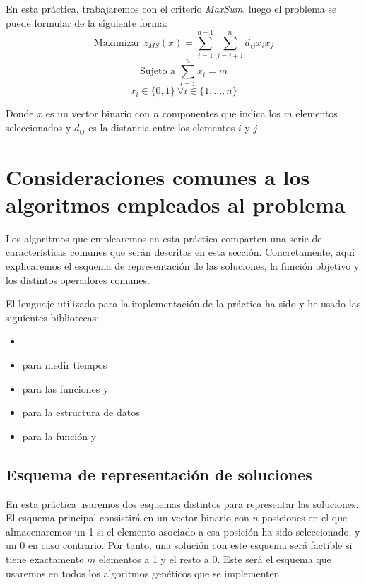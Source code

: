 \documentclass[10pt,a4paper]{article}
\begin{document}
En esta práctica, trabajaremos con el criterio \textit{MaxSum}, luego el problema se puede formular de la siguiente forma:
$$ \text{Maximizar  } z_{MS}(x) = \sum_{i=1}^{n-1} \sum_{j=i+1}^{n} d_{ij} x_i x_j $$
$$ \text{Sujeto a  } \sum_{i=1}^{n} x_i = m $$
$$ x_i \in \{0,1\} \ \forall i \in \{1,\dots,n\} $$

Donde $x$ es un vector binario con $n$ componentes que indica los $m$ elementos seleccionados y $d_{ij}$ es la distancia entre los elementos $i$ y $j$.










\section{Consideraciones comunes a los algoritmos empleados al problema}

Los algoritmos que emplearemos en esta práctica comparten una serie de características comunes que serán descritas en esta sección. Concretamente, aquí explicaremos el esquema de representación de las soluciones, la función objetivo y los distintos operadores comunes.

El lenguaje utilizado para la implementación de la práctica ha sido  y he usado las siguientes bibliotecas:

\begin{itemize}
	\item {}
	\item {} para medir tiempos
	\item {} para las funciones  y 
	\item {} para la estructura de datos 
	\item {} para la función  y 
\end{itemize}


\subsection{Esquema de representación de soluciones}

En esta práctica usaremos dos esquemas distintos para representar las soluciones. El esquema principal consistirá en un vector binario con $n$ posiciones en el que almacenaremos un 1 si el elemento asociado a esa posición ha sido seleccionado, y un 0 en caso contrario. Por tanto, una solución con este esquema será factible si tiene exactamente $m$ elementos a 1 y el resto a 0. Este será el esquema que usaremos en todos los algoritmos genéticos que se implementen.
\end{document}
